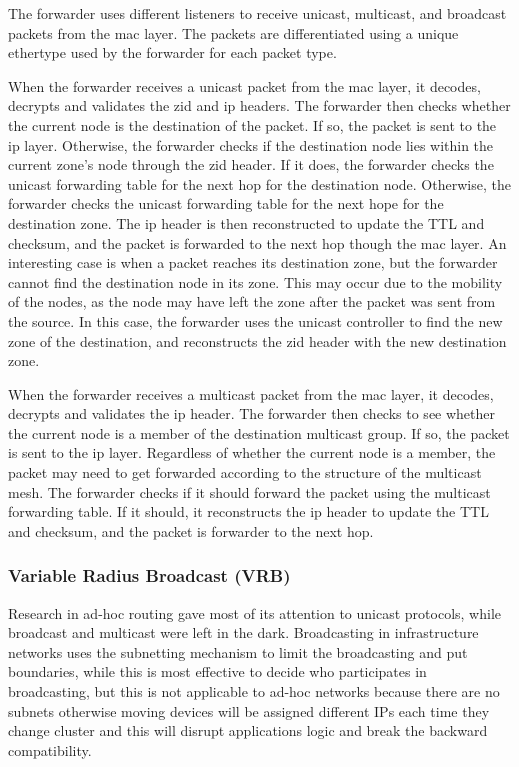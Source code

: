 The forwarder uses different listeners to receive unicast, multicast, and broadcast packets from the \acrshort{mac} layer. The packets are differentiated using a unique ethertype used by the forwarder for each packet type. 

When the forwarder receives a unicast packet from the \acrshort{mac} layer, it decodes, decrypts and validates the \acrshort{zid} and \acrshort{ip} headers. The forwarder then checks whether the current node is the destination of the packet. If so, the packet is sent to the \acrshort{ip} layer. Otherwise, the forwarder checks if the destination node lies within the current zone's node through the \acrshort{zid} header. If it does, the forwarder checks the unicast forwarding table for the next hop for the destination node. Otherwise, the forwarder checks the unicast forwarding table for the next hope for the destination zone. The \acrshort{ip} header is then reconstructed to update the TTL and checksum, and the packet is forwarded to the next hop though the \acrshort{mac} layer. An interesting case is when a packet reaches its destination zone, but the forwarder cannot find the destination node in its zone. This may occur due to the mobility of the nodes, as the node may have left the zone after the packet was sent from the source. In this case, the forwarder uses the unicast controller to find the new zone of the destination, and reconstructs the \acrshort{zid} header with the new destination zone.

When the forwarder receives a multicast packet from the \acrshort{mac} layer, it decodes, decrypts and validates the \acrshort{ip} header. The forwarder then checks to see whether the current node is a member of the destination multicast group. If so, the packet is sent to the \acrshort{ip} layer. Regardless of whether the current node is a member, the packet may need to get forwarded according to the structure of the multicast mesh. The forwarder checks if it should forward the packet using the multicast forwarding table. If it should, it reconstructs the \acrshort{ip} header to update the TTL and checksum, and the packet is forwarder to the next hop.

\subsubsection{Variable Radius Broadcast (VRB)}
Research in ad-hoc routing gave most of its attention to unicast protocols, while broadcast and multicast were left in the dark.
Broadcasting in infrastructure networks uses the subnetting mechanism to limit the broadcasting and put boundaries, while this is most effective to decide who participates in broadcasting, but this is not applicable to ad-hoc networks because there are no subnets otherwise moving devices will be assigned different IPs each time they change cluster and this will disrupt applications logic and break the backward compatibility.

